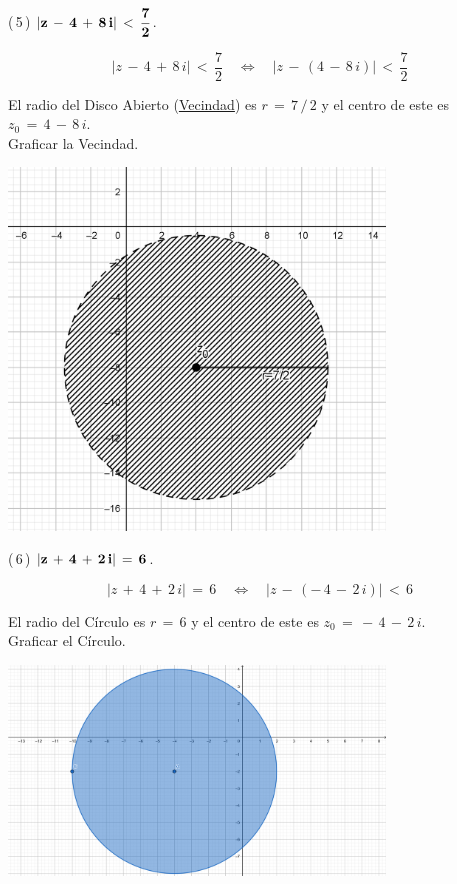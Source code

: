 \documentclass[a4paper,11pt,openany]{book}
\begin{document}
\textcolor{ao(english)}{(\,5\,)} $\bf{|z\,-\,4\,+\,8\,i|\,<\,\dfrac{7}{2}}$.

$$|z\,-\,4\,+\,8\,i|\,<\,\dfrac{7}{2} \quad\iff\quad |z\,-\,(4\,-\,8\,i)|\,<\,\dfrac{7}{2}$$

El radio del Disco Abierto (\underline{Vecindad}) es $r\,=\,7\,/\,2$ y el centro de este es $z_{0}\,=\,4\,-\,8\,i$.\\

\textcolor{ao(english)}{} Graficar la Vecindad.

\begin{center}
    \includegraphics[width=10cm]{Gra-Ej-5.png}
\end{center}

\textcolor{ao(english)}{(\,6\,)} $\bf{|z\,+\,4\,+\,2\,i|\,=\,6}$.

$$|z\,+\,4\,+\,2\,i|\,=\,6 \quad\iff\quad |z\,-\,(-\,4\,-\,2\,i)|\,<\,6$$

El radio del Círculo es $r\,=\,6$ y el centro de este es $z_{0}\,=\,-\,4\,-\,2\,i$.\\

\textcolor{ao(english)}{} Graficar el Círculo.

\begin{center}
     \includegraphics[width=10cm]{Gra-Ej-6.png}
\end{center}
\end{document}
